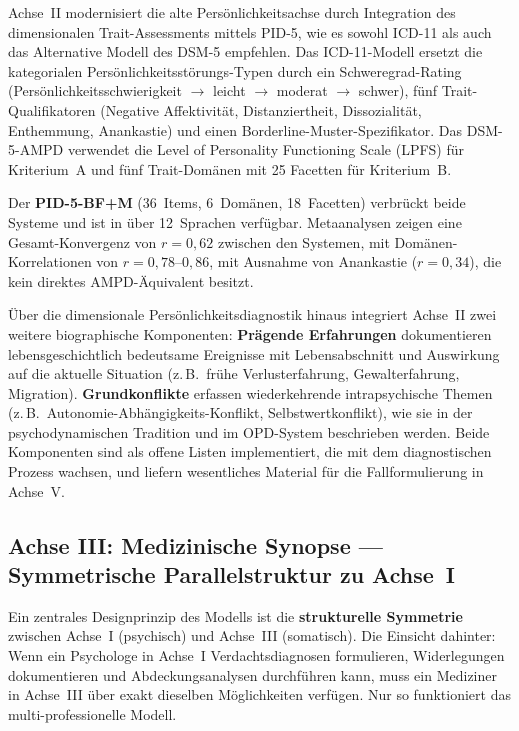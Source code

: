 \documentclass[11pt,a4paper]{article}
\begin{document}
Achse~II modernisiert die alte Pers\"onlichkeitsachse durch Integration des dimensionalen Trait-Assessments mittels PID-5, wie es sowohl ICD-11 als auch das Alternative Modell des DSM-5 empfehlen. Das ICD-11-Modell ersetzt die kategorialen Pers\"onlichkeitsst\"orungs-Typen durch ein Schweregrad-Rating (Pers\"onlichkeitsschwierigkeit $\to$ leicht $\to$ moderat $\to$ schwer), f\"unf Trait-Qualifikatoren (Negative Affektivit\"at, Distanziertheit, Dissozialit\"at, Enthemmung, Anankastie) und einen Borderline-Muster-Spezifikator. Das DSM-5-AMPD verwendet die Level of Personality Functioning Scale (LPFS) f\"ur Kriterium~A und f\"unf Trait-Dom\"anen mit 25 Facetten f\"ur Kriterium~B.

Der \textbf{PID-5-BF+M} (36~Items, 6~Dom\"anen, 18~Facetten) verbr\"uckt beide Systeme und ist in \"uber 12~Sprachen verf\"ugbar. Metaanalysen zeigen eine Gesamt-Konvergenz von $r = 0{,}62$ zwischen den Systemen, mit Dom\"anen-Korrelationen von $r = 0{,}78$--$0{,}86$, mit Ausnahme von Anankastie ($r = 0{,}34$), die kein direktes AMPD-\"Aquivalent besitzt.

\"Uber die dimensionale Pers\"onlichkeitsdiagnostik hinaus integriert Achse~II zwei weitere biographische Komponenten: \textbf{Pr\"agende Erfahrungen} dokumentieren lebensgeschichtlich bedeutsame Ereignisse mit Lebensabschnitt und Auswirkung auf die aktuelle Situation (z.\,B.\ fr\"uhe Verlusterfahrung, Gewalterfahrung, Migration). \textbf{Grundkonflikte} erfassen wiederkehrende intrapsychische Themen (z.\,B.\ Autonomie-Abh\"angigkeits-Konflikt, Selbstwertkonflikt), wie sie in der psychodynamischen Tradition und im OPD-System beschrieben werden. Beide Komponenten sind als offene Listen implementiert, die mit dem diagnostischen Prozess wachsen, und liefern wesentliches Material f\"ur die Fallformulierung in Achse~V.

\subsection{Achse III: Medizinische Synopse --- Symmetrische Parallelstruktur zu Achse~I}
\label{sec:achse3}

Ein zentrales Designprinzip des Modells ist die \textbf{strukturelle Symmetrie} zwischen Achse~I (psychisch) und Achse~III (somatisch). Die Einsicht dahinter: Wenn ein Psychologe in Achse~I Verdachtsdiagnosen formulieren, Widerlegungen dokumentieren und Abdeckungsanalysen durchf\"uhren kann, muss ein Mediziner in Achse~III \"uber exakt dieselben M\"oglichkeiten verf\"ugen. Nur so funktioniert das multi-professionelle Modell.
\end{document}
